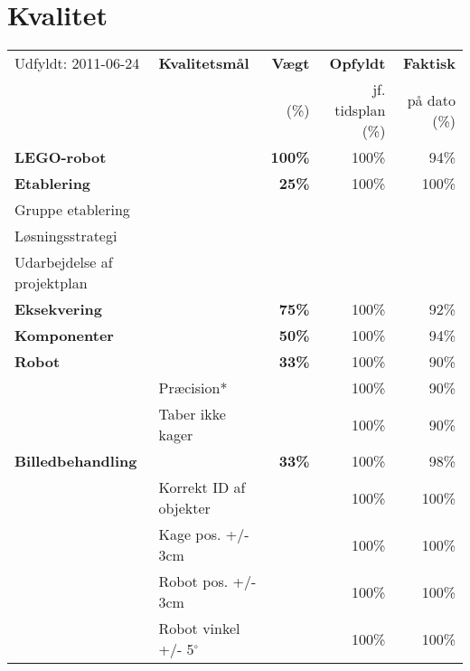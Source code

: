 \section{Kvalitet}
\begin{footnotesize}
\begin{center}
\begin{tabular}{l | l | r r r}
	\footnotesize{Udfyldt: 2011-06-24}	& \textbf{Kvalitetsmål} & \textbf{Vægt} & \textbf{Opfyldt} & \textbf{Faktisk}\\
	& & \footnotesize{(\%)}	& \footnotesize{jf. tidsplan (\%)}	& \footnotesize{på dato (\%)} \\
	\hline
	\textbf{LEGO-robot}
																&		& \textbf{100\%} & 100\% & 94\% \\
	\hline
	\hline
	\textbf{Etablering}
																&		& \textbf{25\%} 	& 	100\%	& 100\% \\
	\hspace*{0.3cm} Gruppe etablering
					 											&		&		&		& \\
	\hspace*{0.3cm} Løsningsstrategi
					 											&		&		&		& \\
	\hspace*{0.3cm} Udarbejdelse af projektplan 
																&		&		&		& \\
	\hline
	\textbf{Eksekvering}
																&		& \textbf{75\%}	& 100\% & 92\% \\		
	\hspace*{0.3cm}\textbf{Komponenter}
																&		& \textbf{50\%}		& 	100\% & 94\%\\
	\hspace*{0.3cm}\hspace*{0.3cm} \textbf{Robot}
																& 		& \textbf{33\%} 	& 	100\% & 90\% \\
	& Præcision* & & 100\% & 90\% \\
	& Taber ikke kager & & 100\% & 90\% \\
	\hspace*{0.3cm}\hspace*{0.3cm} \textbf{Billedbehandling}
																& & \textbf{33\%}		&	100\% & 	98\% \\
	& Korrekt ID af objekter & & 100\% & 100\% \\
	& Kage pos. +/- 3cm & & 100\% & 100\% \\
	& Robot pos. +/- 3cm & & 100\% & 100\% \\
	& Robot vinkel +/- 5$^\circ$ & & 100\% & 100\% \\

\end{tabular}
\end{center}
\end{footnotesize}
